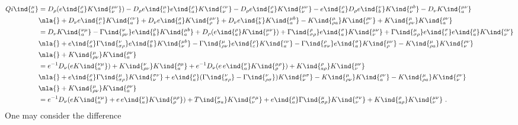 \documentclass[11pt]{article}
\begin{document}
\begin{align*}
	Qi\ind{^\mu_a} &= D_\rho( e\ind{_a^\rho}  K\ind{^{\mu\nu}_\nu} 
	) -  D_\rho e\ind{_c^\mu} e\ind{_a^\rho} K\ind{^{c\nu}_\nu} - 
	D_\rho e\ind{_a^\rho} K\ind{^{\mu\nu}_\nu} - e\ind{_a^\rho} 
	D_\rho e\ind{_b^\nu} K\ind{^{\mu b}_\nu} - D_\nu 
	K\ind{^{\mu\nu}_a} \\
	&\nla{}+  D_\nu e\ind{_c^\mu} K\ind{^{c\nu}_a} + D_\nu 
	e\ind{_a^\rho} K\ind{^{\mu\nu}_\rho} + D_\nu e\ind{_b^\nu} 
	K\ind{^{\mu b}_a} - K\ind{^\mu_{\rho a}} K\ind{^{\rho\nu}_\nu} 
	+ K\ind{^\mu_{\rho \nu}} K\ind{^{\rho\nu}_a}
	\\
	&= D_\nu K\ind{^{\nu\mu}_a} - \Gamma\ind{^\nu_{\rho\nu}} 
	e\ind{_b^\rho} K\ind{^{\mu b}_a} + D_\rho( e\ind{_a^\rho}  
	K\ind{^{\mu\nu}_\nu} ) + \Gamma\ind{^\rho_{\sigma\rho}} 
	e\ind{_a^\sigma} K\ind{^{\mu\nu}_\nu} + 
	\Gamma\ind{^\mu_{\sigma\rho}} e\ind{_c^\sigma} e\ind{_a^\rho} 
	K\ind{^{c\nu}_\nu} \\
	&\nla{} + e\ind{_a^\rho} \Gamma\ind{^\nu_{\sigma\rho}} 
	e\ind{_b^\sigma} K\ind{^{\mu b}_\nu} - 
	\Gamma\ind{^\mu_{\rho\nu}} e\ind{_c^\rho} K\ind{^{c\nu}_a} - 
	\Gamma\ind{^\rho_{\sigma\nu}} e\ind{_a^\sigma} 
	K\ind{^{\mu\nu}_\rho} - K\ind{^\mu_{\rho a}} 
	K\ind{^{\rho\nu}_\nu} \\
	&\nla{}+ K\ind{^\mu_{\rho \nu}} K\ind{^{\rho\nu}_a}
	\\
	&= e^{-1} D_\nu (e K\ind{^{\nu\mu}_a} ) + 
	K\ind{^\nu_{\rho\nu}} K\ind{^{\rho\mu}_a} + e^{-1} D_\nu ( e\,
	e\ind{_a^\nu} K\ind{^{\mu\rho}_\rho} ) + K\ind{^\rho_{a\rho}} 
	K\ind{^{\mu\nu}_\nu}	\\
	&\nla{}+ e\ind{_a^\rho} \Gamma\ind{^\mu_{\sigma\rho}} 
	K\ind{^{\sigma\nu}_\nu} + e\ind{_a^\rho} ( 
	\Gamma\ind{^\nu_{\sigma\rho}} - \Gamma\ind{^\nu_{\rho\sigma}} 
	) K\ind{^{\mu\sigma}_\nu} - K\ind{^\mu_{\rho\nu}} 
	K\ind{^{\rho\nu}_a} - K\ind{^\mu_{\rho a}} 
	K\ind{^{\rho\nu}_\nu} \\
	&\nla{}+ K\ind{^\mu_{\rho \nu}} K\ind{^{\rho\nu}_a}
	\\
	&= e^{-1} D_\nu( e K\ind{^{\nu\mu}_a} + e\, e\ind{_a^\nu} 
	K\ind{^{\mu\rho}_\rho} ) +  T\ind{^\nu_{\sigma a}}	
	K\ind{^{\sigma\mu}_\nu} + e\ind{_a^\rho} 
	\Gamma\ind{^\mu_{\sigma\rho}} K\ind{^{\sigma\nu}_\nu} + 
	K\ind{^\rho_{a\rho}} K\ind{^{\mu\nu}_\nu}~.
\end{align*}
One may consider the difference
\end{document}
